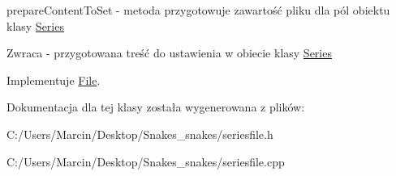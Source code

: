 prepare\+Content\+To\+Set -\/ metoda przygotowuje zawartość pliku dla pól obiektu klasy \hyperlink{class_series}{Series} 

\begin{DoxyReturn}{Zwraca}
-\/ przygotowana treść do ustawienia w obiecie klasy \hyperlink{class_series}{Series} 
\end{DoxyReturn}


Implementuje \hyperlink{class_file}{File}.



Dokumentacja dla tej klasy została wygenerowana z plików\+:\begin{DoxyCompactItemize}
\item 
C\+:/\+Users/\+Marcin/\+Desktop/\+Snakes\+\_\+snakes/seriesfile.\+h\item 
C\+:/\+Users/\+Marcin/\+Desktop/\+Snakes\+\_\+snakes/seriesfile.\+cpp\end{DoxyCompactItemize}
